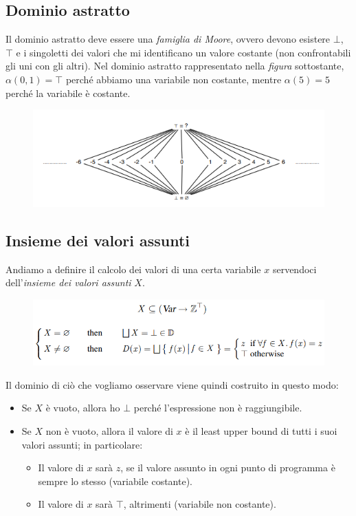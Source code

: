 \documentclass[a4paper,oneside,titlepage]{book}
\begin{document}
\subsection{Dominio astratto}
Il dominio astratto deve essere una \textit{famiglia di Moore}, ovvero devono esistere $\bot$, $\top$ e i singoletti dei valori che mi identificano un valore costante (non confrontabili gli uni con gli altri). Nel dominio astratto rappresentato nella \textit{figura} sottostante, $\alpha({0,1})=\top$ perché abbiamo una variabile non costante, mentre $\alpha({5})=5$ perché la variabile è costante.
\begin{figure}[htp]
	\centering
	\includegraphics[width=\textwidth, height=\textheight, keepaspectratio]{const4.png}
\end{figure}

\subsection{Insieme dei valori assunti}
Andiamo a definire il calcolo dei valori di una certa variabile $x$ servendoci dell'\textit{insieme dei valori assunti} $X$.
\begin{figure}[htp]
	\centering
	\includegraphics[width=\textwidth, height=\textheight, keepaspectratio]{const5.png}
\end{figure}

\noindent
Il dominio di ciò che vogliamo osservare viene quindi costruito in questo modo:
\begin{itemize}
    \item Se $X$ è vuoto, allora ho $\bot$ perché l'espressione non è raggiungibile.
    \item Se $X$ non è vuoto, allora il valore di $x$ è il least upper bound di tutti i suoi valori assunti; in particolare:
    \begin{itemize}
        \item Il valore di $x$ sarà $z$, se il valore assunto in ogni punto di programma è sempre lo stesso (variabile costante).
        \item Il valore di $x$ sarà $\top$, altrimenti (variabile non costante). 
    \end{itemize}
\end{itemize}
\end{document}
